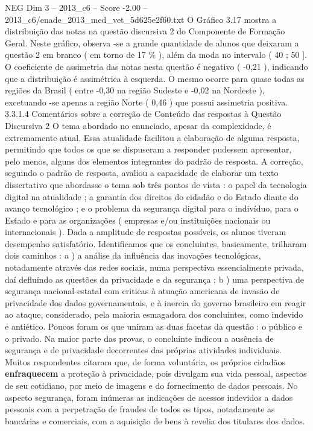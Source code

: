 \begin{textsample}{NEG Dim 3 – 2013\_c6 – Score -2.00 – 2013\_c6/enade\_2013\_med\_vet\_5d625e2f60.txt}
O Gráfico 3.17 mostra a distribuição das notas na questão discursiva 2 do Componente de Formação Geral.
Neste gráfico, observa -se a grande quantidade de alunos que deixaram a questão 2 em branco ( em torno de 17 \% ), além da moda no intervalo ( 40 ; 50 ].
O coeficiente de assimetria das notas nesta questão é negativo ( -0,21 ), indicando que a distribuição é assimétrica à esquerda.
O mesmo ocorre para quase todas as regiões da Brasil ( entre -0,30 na região Sudeste e -0,02 na Nordeste ), excetuando -se apenas a região Norte ( 0,46 ) que possui assimetria positiva. 3.3.1.4 Comentários sobre a correção de Conteúdo das respostas à Questão Discursiva 2 O tema abordado no enunciado, apesar da complexidade, é extremamente atual.
Essa atualidade facilitou a elaboração de alguma resposta, permitindo que todos os que se dispuseram a responder pudessem apresentar, pelo menos, alguns dos elementos integrantes do padrão de resposta.
A correção, seguindo o padrão de resposta, avaliou a capacidade de elaborar um texto dissertativo que abordasse o tema sob três pontos de vista : o papel da tecnologia digital na atualidade ; a garantia dos direitos do cidadão e do Estado diante do avanço tecnológico ; e o problema da segurança digital para o indivíduo, para o Estado e para as organizações ( empresas e/ou instituições nacionais ou internacionais ).
Dada a amplitude de respostas possíveis, os alunos tiveram desempenho satisfatório.
Identificamos que os concluintes, basicamente, trilharam dois caminhos : a ) a análise da influência das inovações tecnológicas, notadamente através das redes sociais, numa perspectiva essencialmente privada, daí defluindo as questões da privacidade e da segurança ; b ) uma perspectiva de segurança nacional-estatal com criticas à atuação americana de invasão de privacidade dos dados governamentais, e à inercia do governo brasileiro em reagir ao ataque, considerado, pela maioria esmagadora dos concluintes, como indevido e antiético.
Poucos foram os que uniram as duas facetas da questão : o público e o privado.
Na maior parte das provas, o concluinte indicou a ausência de segurança e de privacidade decorrentes das próprias atividades individuais.
Muitos respondentes citaram que, de forma voluntária, os próprios cidadãos \textbf{enfraquecem} a proteção à privacidade, pois divulgam sua vida pessoal, aspectos de seu cotidiano, por meio de imagens e do fornecimento de dados pessoais.
No aspecto segurança, foram inúmeras as indicações de acessos indevidos a dados pessoais com a perpetração de fraudes de todos os tipos, notadamente as bancárias e comerciais, com a aquisição de bens à revelia dos titulares dos dados.

\end{textsample}
